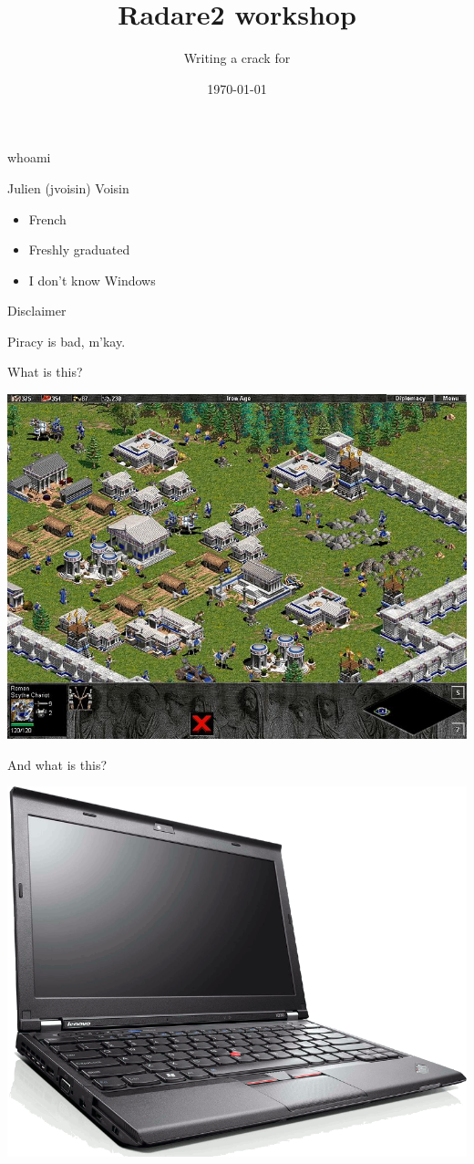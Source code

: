 \documentclass{beamer}
\title{Radare2 workshop}
\author{Writing a crack for \blackout{Age of Empire} }
\date{\today}
\institute{hack.lu 2015}
\begin{document}
\maketitle

\begin{frame}{whoami}
	\begin{block}{Julien (jvoisin) Voisin}
	\begin{itemize}
		\item French
		\item Freshly graduated
		\item I don't know Windows
	\end{itemize}
	\end{block}
\end{frame}

\begin{frame}{Disclaimer}
	\begin{center}
		Piracy is \alert{bad}, m'kay.
	\end{center}
\end{frame}

\begin{frame}{What is this?}
	\begin{center}
		\includegraphics[width=.9\textwidth]{aoe.jpg}
	\end{center}
\end{frame}

\begin{frame}{And what is this?}
	\begin{center}
		\includegraphics[width=.75\textwidth]{x230.png}
	\end{center}
\end{frame}
\end{document}
